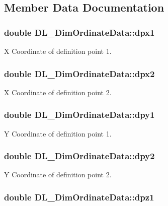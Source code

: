 \subsection{Member Data Documentation}
\hypertarget{structDL__DimOrdinateData_aef8694a6d321e7f6a01134b3c5b36b02}{
\subsubsection[{dpx1}]{\setlength{\rightskip}{0pt plus 5cm}double D\-L\-\_\-\-Dim\-Ordinate\-Data\-::dpx1}}\label{structDL__DimOrdinateData_aef8694a6d321e7f6a01134b3c5b36b02}
X Coordinate of definition point 1. \hypertarget{structDL__DimOrdinateData_a3dd62fba09e5d66433cad731fbf485ec}{
\subsubsection[{dpx2}]{\setlength{\rightskip}{0pt plus 5cm}double D\-L\-\_\-\-Dim\-Ordinate\-Data\-::dpx2}}\label{structDL__DimOrdinateData_a3dd62fba09e5d66433cad731fbf485ec}
X Coordinate of definition point 2. \hypertarget{structDL__DimOrdinateData_a6f8c41156a98f323634f3867e927a4b2}{
\subsubsection[{dpy1}]{\setlength{\rightskip}{0pt plus 5cm}double D\-L\-\_\-\-Dim\-Ordinate\-Data\-::dpy1}}\label{structDL__DimOrdinateData_a6f8c41156a98f323634f3867e927a4b2}
Y Coordinate of definition point 1. \hypertarget{structDL__DimOrdinateData_a2d792c23338fd746608c319f1b90967c}{
\subsubsection[{dpy2}]{\setlength{\rightskip}{0pt plus 5cm}double D\-L\-\_\-\-Dim\-Ordinate\-Data\-::dpy2}}\label{structDL__DimOrdinateData_a2d792c23338fd746608c319f1b90967c}
Y Coordinate of definition point 2. \hypertarget{structDL__DimOrdinateData_a7a17ae1d34b60fe28d4343da393fa64d}{
\subsubsection[{dpz1}]{\setlength{\rightskip}{0pt plus 5cm}double D\-L\-\_\-\-Dim\-Ordinate\-Data\-::dpz1}}\label{structDL__DimOrdinateData_a7a17ae1d34b60fe28d4343da393fa64d}
